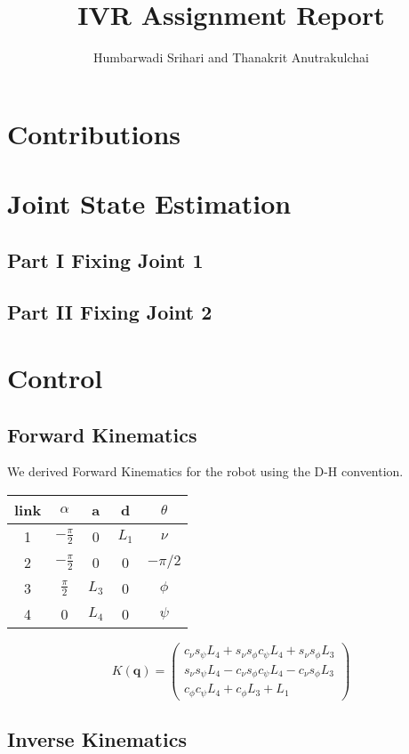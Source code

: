 \documentclass[11pt, a4paper]{article}
\title{IVR Assignment Report}
\author{Humbarwadi Srihari and Thanakrit Anutrakulchai}
\begin{document}
    \maketitle
    \section{Contributions}
    \section{Joint State Estimation}
    \subsection{Part I \textemdash Fixing Joint 1}
    \subsection{Part II \textemdash Fixing Joint 2}
    \section{Control}
    \subsection{Forward Kinematics}
    We derived Forward Kinematics for the robot using the D-H convention.
    \begin{center}
        \begin{tabular}{ |c|c|c|c|c| }
            \hline
            link & $\alpha$ & a & d & $\theta$\\
            \hline
            1 & $-\frac{\pi}{2}$ & 0 & $L_1$ & $\nu$\\
            2 & $-\frac{\pi}{2}$ & 0 & 0 & $-\pi/2$\\
            3 & $\frac{\pi}{2}$ & $L_3$ & 0 & $\phi$\\
            4 & 0 & $L_4$ & 0 & $\psi$\\
            \hline
        \end{tabular}
    \end{center}
    

    $$
    K(\textbf{q}) = 
        \begin{pmatrix}
            c_{\nu}s_{\psi}L_4 + s_{\nu}s_{\phi}c_{\psi}L_4 + s_{\nu}s_{\phi}L_3\\
            s_{\nu}s_{\psi}L_4 - c_{\nu}s_{\phi}c_{\psi}L_4 - c_{\nu}s_{\phi}L_3\\
            c_{\phi}c_{\psi}L_4 + c_{\phi}L_3 + L_1
        \end{pmatrix}
    $$
    \subsection{Inverse Kinematics}
\end{document}
